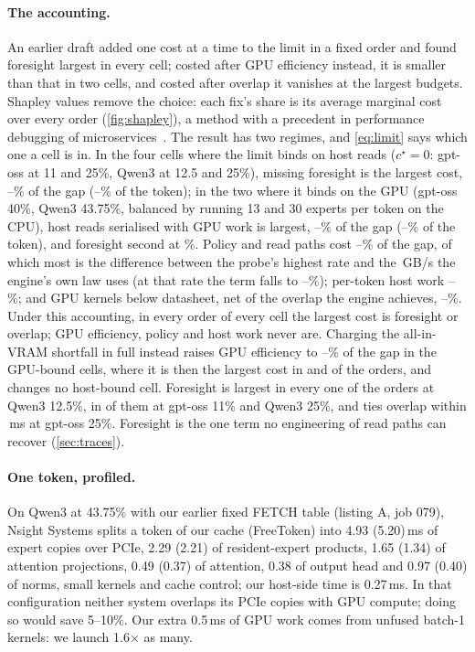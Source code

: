 \documentclass[10pt,twocolumn]{article}
\begin{document}
\paragraph{The accounting.} An earlier draft added one cost at a time to the limit in a fixed order and found
foresight largest in every cell; costed after GPU efficiency instead, it is smaller than that in two cells, and
costed after overlap it vanishes at the largest budgets. Shapley values remove the choice: each fix's share is its
average marginal cost over every order (\cref{fig:shapley}), a method with a precedent in performance debugging of
microservices~\cite{shapleyiq2024}. The result has two regimes, and \cref{eq:limit} says which one a cell is in. In the
four cells where the limit binds on host reads ($c^\star{=}0$: gpt-oss at 11 and 25\%, Qwen3 at 12.5 and 25\%),
missing foresight is the largest cost, \shFsHostMin--\shFsHostMax\% of the gap (\shFsHostTokMin--\shFsHostTokMax\%
of the token); in the two where it binds on the GPU (gpt-oss 40\%, Qwen3 43.75\%, balanced by running 13 and 30
experts per token on the CPU), host reads serialised with GPU work is largest, \shOvlGpuMin--\shOvlGpuMax\% of the gap
(\shOvlGpuTokMin--\shOvlGpuTokMax\% of the token), and foresight second at \shFsGpuMin\%. Policy and read paths cost
\shPolMin--\shPolMax\% of the gap, of which most is the difference between the probe's highest rate and the
\shBhostZc\,GB/s the engine's own law uses (at that rate the term falls to \shPolZcMin--\shPolZcMax\%); per-token
host work \shHostMin--\shHostMax\%; and GPU kernels below datasheet, net of the overlap the engine achieves,
\shGpuMin--\shGpuMax\%. Under this accounting, in every order of every cell the largest cost is foresight or overlap;
GPU efficiency, policy and host work never are. Charging the all-in-VRAM shortfall in full instead raises GPU
efficiency to \shGpuGrossMin--\shGpuGrossMax\% of the gap in the GPU-bound cells, where it is then the largest cost in
\shGpuGrossOrdersGHigh{} and \shGpuGrossOrdersQHigh{} of the \shOrders{} orders, and changes no host-bound cell.
Foresight is largest in every one of the \shOrders{} orders at Qwen3 12.5\%, in \shOrdersGLow{} of them at gpt-oss
11\% and Qwen3 25\%, and ties overlap within \shTieMs\,ms at gpt-oss 25\%. Foresight is the one term no
engineering of read paths can recover (\cref{sec:traces}).

\paragraph{One token, profiled.} On Qwen3 at 43.75\% with our earlier fixed FETCH table (listing A, job 079), Nsight
Systems splits a token of our cache (FreeToken) into
4.93 (5.20)\,ms of expert copies over PCIe, 2.29 (2.21) of resident-expert products, 1.65 (1.34) of attention
projections, 0.49 (0.37) of attention, 0.38 of output head and 0.97 (0.40) of norms, small kernels and cache
control; our host-side time is 0.27\,ms. In that configuration neither system overlaps its PCIe copies with GPU
compute; doing so would save 5--10\%. Our extra 0.5\,ms of GPU work comes from unfused batch-1 kernels: we launch
1.6$\times$ as many.
\end{document}

